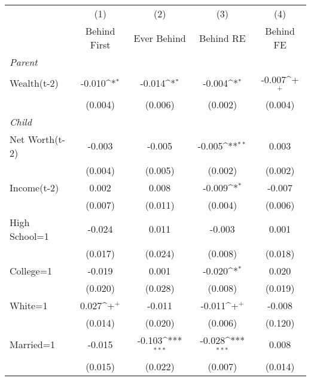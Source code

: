 {
\def\sym#1{\ifmmode^{#1}\else\(^{#1}\)\fi}
\begin{tabular}{l*{4}{c}}
\toprule
                &\multicolumn{1}{c}{(1)}&\multicolumn{1}{c}{(2)}&\multicolumn{1}{c}{(3)}&\multicolumn{1}{c}{(4)}\\
                &\multicolumn{1}{c}{Behind First}&\multicolumn{1}{c}{Ever Behind}&\multicolumn{1}{c}{Behind RE}&\multicolumn{1}{c}{Behind FE}\\
\midrule
\textit{Parent} &                  &                  &                  &                  \\
\;Wealth(t-2)   &   -0.010\sym{*}  &   -0.014\sym{*}  &   -0.004\sym{*}  &   -0.007\sym{+}  \\
                &  (0.004)         &  (0.006)         &  (0.002)         &  (0.004)         \\
\textit{Child}  &                  &                  &                  &                  \\
\;Net Worth(t-2)&   -0.003         &   -0.005         &   -0.005\sym{**} &    0.003         \\
                &  (0.004)         &  (0.005)         &  (0.002)         &  (0.002)         \\
\;Income(t-2)   &    0.002         &    0.008         &   -0.009\sym{*}  &   -0.007         \\
                &  (0.007)         &  (0.011)         &  (0.004)         &  (0.006)         \\
\;High School=1 &   -0.024         &    0.011         &   -0.003         &    0.001         \\
                &  (0.017)         &  (0.024)         &  (0.008)         &  (0.018)         \\
\;College=1     &   -0.019         &    0.001         &   -0.020\sym{*}  &    0.020         \\
                &  (0.020)         &  (0.028)         &  (0.008)         &  (0.019)         \\
\;White=1       &    0.027\sym{+}  &   -0.011         &   -0.011\sym{+}  &   -0.008         \\
                &  (0.014)         &  (0.020)         &  (0.006)         &  (0.120)         \\
\;Married=1     &   -0.015         &   -0.103\sym{***}&   -0.028\sym{***}&    0.008         \\
                &  (0.015)         &  (0.022)         &  (0.007)         &  (0.014)         \\

\end{tabular}}
